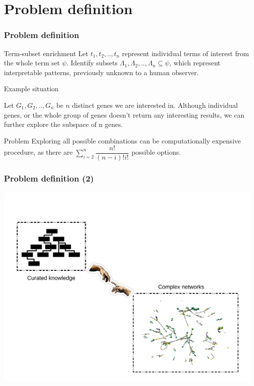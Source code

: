 \documentclass{beamer}
\begin{document}
\section{Problem definition} 
  \begin{frame}\frametitle{Problem definition}

    \begin{block}{Term-subset enrichment}
      Let ${t_{1},t_{2},..,t_{n}}$ represent individual terms of interest from the whole term set $\psi $. Identify subsets $\Lambda_{1},\Lambda_{2},..,\Lambda_{n} \subseteq \psi$, which represent interpretable patterns, previously unknown to a human observer.      
    \end{block}

    \begin{exampleblock}{Example situation}

      Let $G_{1},G_{2},..,G_{n}$ be $n$ distinct genes we are interested in. Although individual genes, or the whole group of genes doesn't return any interesting results, we can further explore the subspace of n genes.

    \end{exampleblock}
    \begin{alertblock}{Problem}
      Exploring all possible combinations can be computationally expensive procedure, as there are $\sum_{i=2}^{n}\dfrac{n!}{(n-i)!i!}$ possible options.      
    \end{alertblock}      
  \end{frame}

  \begin{frame}\frametitle{Problem definition (2)}
    \begin{center}
      \includegraphics[scale=0.6]{images/creation}
    \end{center}
  \end{frame}
  
\end{document}
